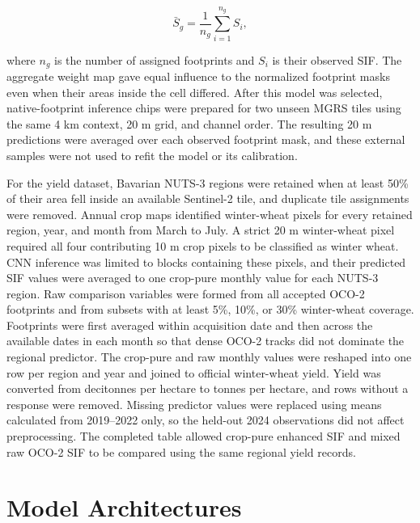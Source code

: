 \begin{equation}
    \bar{S}_g=\frac{1}{n_g}\sum_{i=1}^{n_g}S_i,
    \label{eq:spatial_aggregate_target}
\end{equation}

where $n_g$ is the number of assigned footprints and $S_i$ is their observed SIF. The aggregate weight map gave equal influence to the normalized footprint masks even when their areas inside the cell differed. After this model was selected, native-footprint inference chips were prepared for two unseen MGRS tiles using the same 4 km context, 20 m grid, and channel order. The resulting 20 m predictions were averaged over each observed footprint mask, and these external samples were not used to refit the model or its calibration.

For the yield dataset, Bavarian NUTS-3 regions were retained when at least 50\% of their area fell inside an available Sentinel-2 tile, and duplicate tile assignments were removed. Annual crop maps identified winter-wheat pixels for every retained region, year, and month from March to July. A strict 20 m winter-wheat pixel required all four contributing 10 m crop pixels to be classified as winter wheat. CNN inference was limited to blocks containing these pixels, and their predicted SIF values were averaged to one crop-pure monthly value for each NUTS-3 region. Raw comparison variables were formed from all accepted OCO-2 footprints and from subsets with at least 5\%, 10\%, or 30\% winter-wheat coverage. Footprints were first averaged within acquisition date and then across the available dates in each month so that dense OCO-2 tracks did not dominate the regional predictor. The crop-pure and raw monthly values were reshaped into one row per region and year and joined to official winter-wheat yield. Yield was converted from decitonnes per hectare to tonnes per hectare, and rows without a response were removed. Missing predictor values were replaced using means calculated from 2019--2022 only, so the held-out 2024 observations did not affect preprocessing. The completed table allowed crop-pure enhanced SIF and mixed raw OCO-2 SIF to be compared using the same regional yield records.

\section{Model Architectures}

